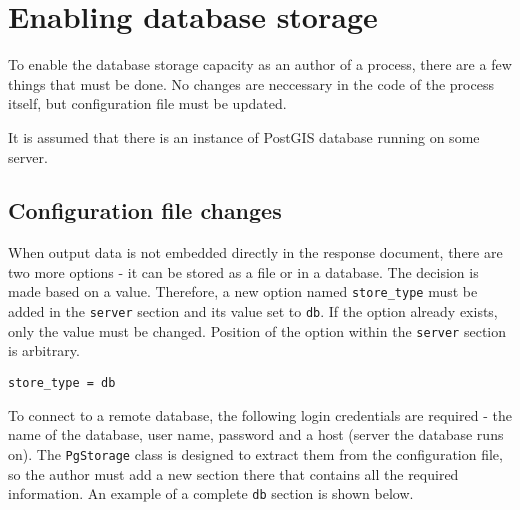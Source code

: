 \chapter{Enabling database storage} \label{appendix}
\label{Enabling-database-storage}

To enable the database storage capacity as an author of a process,
there are a few things that must be done. No changes are neccessary in
the code of the process itself, but configuration file must be
updated.

It is assumed that there is an instance of PostGIS database running on some server.


\section{Configuration file changes} \label{cfgchanges}

When output data is not embedded directly in the response document,
there are two more options - it can be stored as a file or in a
database. The decision is made based on a value. Therefore, a new
option named \texttt{store\_type} must be added in the \texttt{server}
section and its value set to \texttt{db}. If the option already
exists, only the value must be changed. Position of the option within
the \texttt{server} section is arbitrary.

\begin{verbatim}
store_type = db
\end{verbatim}


To connect to a remote database, the following login credentials are
required - the name of the database, user name, password and a host
(server the database runs on). The \texttt{PgStorage} class is designed
to extract them from the configuration file, so the author must add a
new section there that contains all the required information. An
example of a complete \texttt{db} section is shown below.

